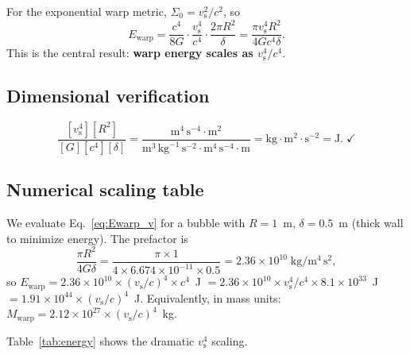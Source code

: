 \documentclass[prd,twocolumn,superscriptaddress,longbibliography]{revtex4-2}
\newcommand{\vs}{v_{\mathrm{s}}}
\newcommand{\Ewarp}{E_{\mathrm{warp}}}
\begin{document}
For the exponential warp metric, $\Sigma_0 = \vs^2/c^2$, so
\begin{equation}
\label{eq:Ewarp_v}
\Ewarp = \frac{c^4}{8G}\cdot\frac{\vs^4}{c^4}
\cdot\frac{2\pi R^2}{\delta}
= \frac{\pi\vs^4 R^2}{4Gc^4\delta}.
\end{equation}
This is the central result: \textbf{warp energy scales as
$\vs^4/c^4$}.

\subsection{Dimensional verification}

\begin{equation}
\frac{[\vs^4][R^2]}{[G][c^4][\delta]}
= \frac{\mathrm{m}^4\,\mathrm{s}^{-4}\cdot\mathrm{m}^2}
{\mathrm{m}^3\,\mathrm{kg}^{-1}\,\mathrm{s}^{-2}
\cdot\mathrm{m}^4\,\mathrm{s}^{-4}\cdot\mathrm{m}}
= \mathrm{kg}\cdot\mathrm{m}^2\cdot\mathrm{s}^{-2}
= \mathrm{J}.\;\checkmark
\end{equation}

\subsection{Numerical scaling table}

We evaluate Eq.~\eqref{eq:Ewarp_v} for a bubble with $R = 1$~m,
$\delta = 0.5$~m (thick wall to minimize energy).  The prefactor
is
\begin{equation}
\frac{\pi R^2}{4G\delta}
= \frac{\pi \times 1}{4 \times 6.674\times 10^{-11}\times 0.5}
= 2.36\times 10^{10}\;\mathrm{kg/m^4\,s^2},
\end{equation}
so $\Ewarp = 2.36\times 10^{10}\times (\vs/c)^4\times c^4$~J
$= 2.36\times 10^{10}\times \vs^4/c^4 \times 8.1\times 10^{33}$~J
$= 1.91\times 10^{44}\times(\vs/c)^4$~J.  Equivalently, in mass
units: $M_{\mathrm{warp}} = 2.12\times 10^{27}\times(\vs/c)^4$~kg.

Table~\ref{tab:energy} shows the dramatic $\vs^4$ scaling.
\end{document}

